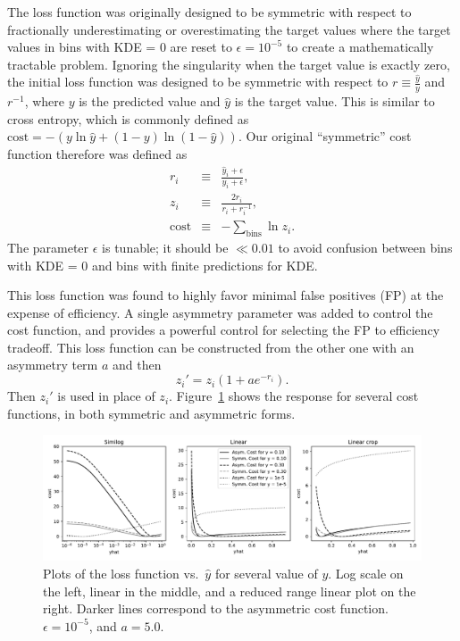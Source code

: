 \documentclass[a4paper]{jpconf}
\begin{document}
The loss function was originally designed to be symmetric with respect to fractionally underestimating or overestimating the target values where the target values in bins with KDE = 0 are reset to $ \epsilon = 10^{-5} $ to create a mathematically tractable problem.  Ignoring the singularity when the target value is exactly zero, the initial loss function was designed to be symmetric with respect to  $r \equiv \frac{\hat y}{y}$ and $r^{-1}$, where $y$ is the predicted value and $\hat y$ is the target value. This is similar to cross entropy, which is commonly defined as
%
$
\mathrm{cost} = - \left(
y \ln \hat y + (1-y) \ln (1 - \hat y)
\right)
$.
%
Our original ``symmetric'' cost function therefore was defined as
\begin{eqnarray}
r_i & \equiv & \frac{\hat y_i + \epsilon}{y_i + \epsilon}, \\
z_i & \equiv & \frac{2 r_i}{r_i + r_i^{-1}}, \\
\mathrm{cost}  & \equiv &- \sum_\mathrm{bins} \ln z_i.
\end{eqnarray}
%
The parameter $ \epsilon $ is tunable; it should be $ \ll 0.01 $ to avoid confusion between bins with KDE = 0 and bins with finite predictions for KDE.

This loss function was found to highly favor minimal false positives (FP) at the expense of efficiency. A single asymmetry parameter was added to control the cost function, and provides a powerful control for selecting the FP to efficiency tradeoff. This loss function can be constructed from the other one with an asymmetry term $a$ and then
\begin{equation}
z_i' = z_i \left(
1+a e^{-r_i}
\right).
\end{equation}
Then $z_i'$ is used in place of $z_i$.
Figure~\ref{fig:loss} shows the response for several cost functions, in both symmetric and asymmetric forms.


\begin{figure}
	\centering
	\includegraphics[width=\textwidth]{images/LossPaper.pdf}
	\caption{Plots of the loss function vs.\ $\hat y$ for several value of $y$. Log scale on the left, linear in the middle, and a reduced range linear plot on the right. Darker lines correspond to the asymmetric cost function. $\epsilon=10^{-5}$, and $a=5.0$.}
	\label{fig:loss}
\end{figure}
\end{document}
